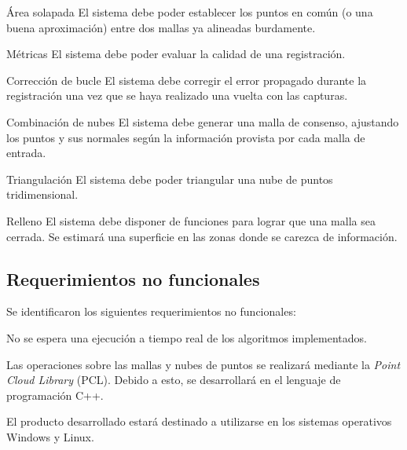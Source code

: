 	\Requerimiento
		{Área solapada}
		{El sistema debe poder establecer los puntos en común (o una buena
		aproximación) entre dos mallas ya alineadas burdamente.}

	\Requerimiento
		{Métricas}
		{El sistema debe poder evaluar la calidad de una registración.}

	\Requerimiento
		{Corrección de bucle}
		{El sistema debe corregir el error propagado durante la registración
		una vez que se haya realizado una vuelta con las capturas.}

	\Requerimiento
		{Combinación de nubes}
		{El sistema debe generar una malla de consenso, ajustando los puntos y sus normales
		según la información provista por cada malla de entrada.}

	\Requerimiento
		{Triangulación}
		{El sistema debe poder triangular una nube de puntos tridimensional.}

	\Requerimiento
		{Relleno}
		{El sistema debe disponer de funciones para lograr que una malla sea cerrada. Se
		estimará una superficie en las zonas donde se carezca de
		información.}

\subsection{Requerimientos no funcionales}
	Se identificaron los siguientes requerimientos no funcionales:

	{No se espera una ejecución a tiempo real de los algoritmos implementados.}

	{Las operaciones sobre las mallas y nubes de puntos se realizará
	mediante la \emph{Point Cloud Library} (PCL).
	Debido a esto, se desarrollará en el lenguaje de programación C++.}


	{El producto desarrollado estará destinado a utilizarse en los sistemas
	operativos Windows y Linux.}
